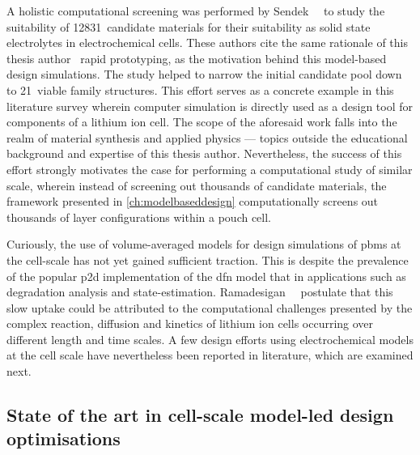 A      holistic      computational      screening     was      performed      by
Sendek~\etal~\cite{Sendek2017}  to  study  the  suitability  of  12831~candidate
materials for their  suitability as solid state  electrolytes in electrochemical
cells. These  authors cite the  same rationale  of this thesis  author \ie~rapid
prototyping, as the  motivation behind this model-based  design simulations. The
study  helped to  narrow the  initial candidate  pool down  to 21~viable  family
structures. This effort  serves as a concrete example in  this literature survey
wherein computer simulation is directly used  as a design tool for components of
a lithium  ion cell. The  scope of  the aforesaid work  falls into the  realm of
material  synthesis  and applied  physics  ---  topics outside  the  educational
background and  expertise of  this thesis author.  Nevertheless, the  success of
this effort  strongly motivates  the case for  performing a  computational study
of  similar scale,  wherein  instead  of screening  out  thousands of  candidate
materials, the framework presented in \cref{ch:modelbaseddesign} computationally
screens out thousands of layer configurations within a pouch cell.

Curiously,  the  use  of  volume-averaged   models  for  design  simulations  of
\glspl{pbm} at  the cell-scale has not  yet gained sufficient traction.  This is
despite the prevalence of the  popular \gls{p2d} implementation of the \gls{dfn}
model that  in applications such  as degradation analysis  and state-estimation.
Ramadesigan~\etal~\cite{Ramadesigan2012} postulate  that this slow  uptake could
be attributed to the computational challenges presented by the complex reaction,
diffusion and kinetics of lithium ion  cells occurring over different length and
time scales. A few design efforts using electrochemical models at the cell scale
have nevertheless been reported in literature, which are examined next.

\subsection{State of the art in cell-scale model-led design optimisations}

